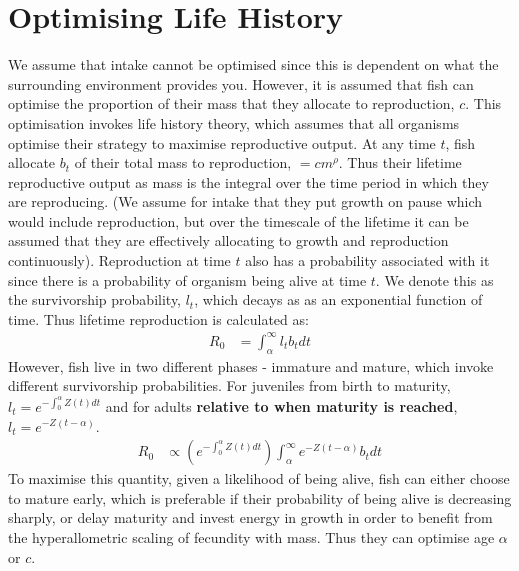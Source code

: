 \documentclass[a4paper]{article} %
\begin{document}
\section{Optimising Life History}
We assume that intake cannot be optimised since this is dependent on what the surrounding environment provides you. However, it is assumed that fish can optimise the proportion of their mass that they allocate to reproduction, $c$. This optimisation invokes life history theory, which assumes that all organisms optimise their strategy to maximise reproductive output. At any time $t$, fish allocate $b_{t}$ of their total mass to reproduction, $= cm^{\rho}$. Thus their lifetime reproductive output as mass is the integral over the time period in which they are reproducing. (We assume for intake that they put growth on pause which would include reproduction, but over the timescale of the lifetime it can be assumed that they are effectively allocating to growth and reproduction continuously). 
Reproduction at time $t$ also has a probability associated with it since there is a probability of organism being alive at time $t$. We denote this as the survivorship probability, $l_{t}$, which decays as as an exponential function of time. Thus lifetime reproduction is calculated as:
\begin{align}
    R_{0} &= \int_{\alpha}^{\infty}l_{t}b_{t} dt
\end{align}
However, fish live in two different phases - immature and mature, which invoke different survivorship probabilities. For juveniles from birth to maturity, $l_t = e^{-\int_{0}^{\alpha}Z(t)dt}$ and for adults \textbf{relative to when maturity is reached}, $l_{t} = e^{-Z(t-\alpha)}$. 
\begin{align}
    R_{0} &\propto (e^{-\int_{0}^{\alpha}Z(t)dt})\int_{\alpha}^{\infty}e^{-Z(t-\alpha)}b_{t} dt
\end{align}
To maximise this quantity, given a likelihood of being alive, fish can either choose to mature early, which is preferable if their probability of being alive is decreasing sharply, or delay maturity and invest energy in growth in order to benefit from the hyperallometric scaling of fecundity with mass. Thus they can optimise age $\alpha$ or $c$.
\newpage
\end{document}
